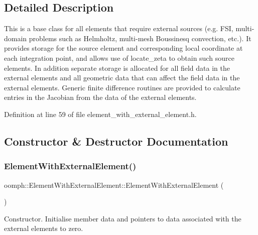 \subsection{Detailed Description}
This is a base class for all elements that require external sources (e.\+g. F\+SI, multi-\/domain problems such as Helmholtz, multi-\/mesh Boussinesq convection, etc.). It provides storage for the source element and corresponding local coordinate at each integration point, and allows use of locate\+\_\+zeta to obtain such source elements. In addition separate storage is allocated for all field data in the external elements and all geometric data that can affect the field data in the external elements. Generic finite difference routines are provided to calculate entries in the Jacobian from the data of the external elements. 

Definition at line 59 of file element\+\_\+with\+\_\+external\+\_\+element.\+h.



\subsection{Constructor \& Destructor Documentation}
\mbox{\label{classoomph_1_1ElementWithExternalElement_aee130ce977f3559845ce7860cb0c0f0e}} 
\subsubsection{\texorpdfstring{Element\+With\+External\+Element()}{ElementWithExternalElement()}\hspace{0.1cm}{\footnotesize\ttfamily [1/2]}}
{\footnotesize\ttfamily oomph\+::\+Element\+With\+External\+Element\+::\+Element\+With\+External\+Element (\begin{DoxyParamCaption}{ }\end{DoxyParamCaption})\hspace{0.3cm}{\ttfamily [inline]}}



Constructor. Initialise member data and pointers to data associated with the external elements to zero. 



